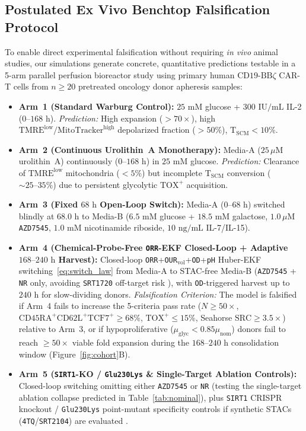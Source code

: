 \documentclass[11pt]{article}
\theoremstyle{plain}
\theoremstyle{remark}
\begin{document}
\subsection{Postulated Ex Vivo Benchtop Falsification Protocol}
To enable direct experimental falsification without requiring \textit{in vivo} animal studies, our simulations generate concrete, quantitative predictions testable in a 5-arm parallel perfusion bioreactor study using primary human $\text{CD19-BB}\zeta$ CAR-T cells from $n \ge 20$ pretreated oncology donor apheresis samples:
\begin{itemize}
  \item \textbf{Arm~1 (Standard Warburg Control):} $25\text{ mM}$ glucose + $300\text{ IU/mL}$ IL-2 ($0\text{--}168\text{ h}$). \textit{Prediction:} High expansion ($>70\times$), high $\text{TMRE}^{\mathrm{low}}/\text{MitoTracker}^{\mathrm{high}}$ depolarized fraction ($>50\%$), $\mathrm{T}_{\mathrm{SCM}} < 10\%$.
  \item \textbf{Arm~2 (Continuous Urolithin~A Monotherapy):} Media-A ($25\,\mu\mathrm{M}$ urolithin~A) continuously ($0\text{--}168\text{ h}$) in $25\text{ mM}$ glucose. \textit{Prediction:} Clearance of $\text{TMRE}^{\mathrm{low}}$ mitochondria ($<5\%$) but incomplete $\mathrm{T}_{\mathrm{SCM}}$ conversion ($\sim 25\text{--}35\%$) due to persistent glycolytic $\text{TOX}^+$ acquisition.
  \item \textbf{Arm~3 (Fixed $68\text{ h}$ Open-Loop Switch):} Media-A ($0\text{--}68\text{ h}$) switched blindly at $68.0\text{ h}$ to Media-B ($6.5\text{ mM}$ glucose + $18.5\text{ mM}$ galactose, $1.0\,\mu\mathrm{M}$ \texttt{AZD7545}, $1.0\text{ mM}$ nicotinamide riboside, $10\text{ ng/mL}$ IL-7/IL-15).
  \item \textbf{Arm~4 (Chemical-Probe-Free \texttt{ORR}-EKF Closed-Loop + Adaptive $168\text{--}240\text{ h}$ Harvest):} Closed-loop \texttt{ORR}+\texttt{OUR}$_{\mathrm{vol}}$+\texttt{OD}+\texttt{pH} Huber-EKF switching~\eqref{eq:switch_law} from Media-A to STAC-free Media-B (\texttt{AZD7545} + \texttt{NR} only, avoiding \texttt{SRT1720} off-target risk \cite{pacholec2010sirt1}), with \texttt{OD}-triggered harvest up to $240\text{ h}$ for slow-dividing donors. \textit{Falsification Criterion:} The model is falsified if Arm~4 fails to increase the 5-criteria pass rate ($N \ge 50\times$, $\text{CD45RA}^+\text{CD62L}^+\text{TCF7}^+ \ge 68\%$, $\mathrm{TOX}^+ \le 15\%$, Seahorse $\mathrm{SRC} \ge 3.5\times$) relative to Arm~3, or if hypoproliferative ($\mu_{\mathrm{glyc}} < 0.85\mu_{\mathrm{nom}}$) donors fail to reach $\ge 50\times$ viable fold expansion during the $168\text{--}240\text{ h}$ consolidation window (Figure~\ref{fig:cohort}B).
  \item \textbf{Arm~5 (\texttt{SIRT1}-KO / \texttt{Glu230Lys} \& Single-Target Ablation Controls):} Closed-loop switching omitting either \texttt{AZD7545} or \texttt{NR} (testing the single-target ablation collapse predicted in Table~\ref{tab:nominal}), plus \texttt{SIRT1} CRISPR knockout / \texttt{Glu230Lys} point-mutant specificity controls if synthetic STACs (\texttt{4TQ}/\texttt{SRT2104}) are evaluated \cite{hubbard2013sirt1}.
\end{itemize}
\end{document}
